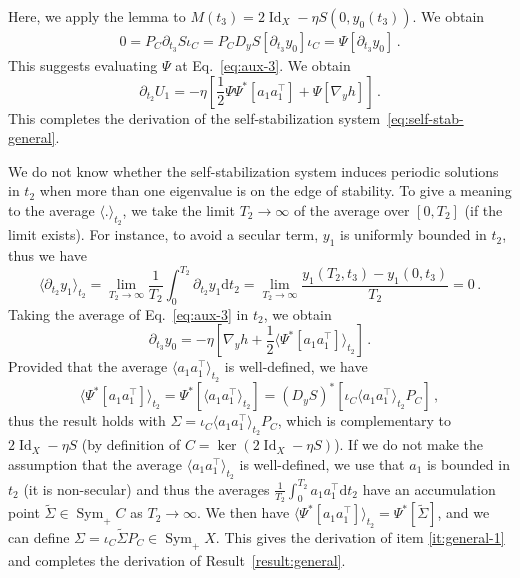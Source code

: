\documentclass[11pt,english,reqno]{article}
\DeclareMathOperator{\Id}{Id}
\DeclareMathOperator{\Sym}{Sym}
\newcommand{\diff}{\mathrm{d}}
\theoremstyle{plain}
\theoremstyle{definition}
\theoremstyle{remark}
\numberwithin{equation}{section}
\begin{document}
    Here, we apply the lemma to $M(t_3) = 2 \Id_X - \eta S(0,y_0(t_3))$. We obtain
    \begin{align*}
        0 = P_C \partial_{t_3} S \iota_C = P_C D_y S[\partial_{t_3} y_0] \iota_C = \Psi[\partial_{t_3} y_0] \, .
    \end{align*}
    This suggests evaluating $\Psi$ at Eq.~\eqref{eq:aux-3}. We obtain 
    \begin{equation*}
        \partial_{t_2} U_1 = - \eta \left[\frac{1}{2} \Psi\Psi^*[a_1 a_1^\top] + \Psi[\nabla_y h]\right] \, .
    \end{equation*}
    This completes the derivation of the self-stabilization system~\eqref{eq:self-stab-general}. 

    We do not know whether the self-stabilization system induces periodic solutions in $t_2$ when more than one eigenvalue is on the edge of stability. To give a meaning to the average $\langle . \rangle_{t_2}$, we take the limit $T_2 \to \infty$ of the average over $[0, T_2]$ (if the limit exists). For instance, to avoid a secular term, $y_1$ is uniformly bounded in $t_2$, thus we have 
    \begin{equation*}
        \langle \partial_{t_2} y_1 \rangle_{t_2} = \lim_{T_2 \to \infty} \frac{1}{T_2} \int_0^{T_2} \partial_{t_2} y_1  \diff t_2 = \lim_{T_2 \to \infty} \frac{y_1(T_2, t_3) - y_1(0, t_3)}{T_2} = 0 \, .
    \end{equation*}
    Taking the average of Eq.~\eqref{eq:aux-3} in $t_2$, we obtain
    \begin{equation*}
        \partial_{t_3} y_0 = - \eta \left[\nabla_y h + \frac{1}{2} \langle \Psi^*[a_1 a_1^\top] \rangle_{t_2}\right] \, .
    \end{equation*}
    Provided that the average $\langle a_1 a_1^\top \rangle_{t_2}$ is well-defined, we have 
    \begin{equation*}
        \langle \Psi^*[a_1 a_1^\top] \rangle_{t_2} = \Psi^*[\langle a_1 a_1^\top \rangle_{t_2}] = (D_y S)^*[\iota_C \langle a_1 a_1^\top \rangle_{t_2} P_C] \, , 
    \end{equation*}
    thus the result holds with $\Sigma = \iota_C \langle a_1 a_1^\top \rangle_{t_2} P_C$, which is complementary to $2 \Id_X - \eta S$ (by definition of $C = \ker(2 \Id_X - \eta S)$). If we do not make the assumption that the average $\langle a_1 a_1^\top \rangle_{t_2}$ is well-defined, we use that $a_1$ is bounded in $t_2$ (it is non-secular) and thus the averages $\frac{1}{T_2} \int_0^{T_2} a_1 a_1^\top \diff t_2$ have an accumulation point $\widetilde{\Sigma} \in \Sym_+ C$ as $T_2 \to \infty$. We then have $\langle \Psi^*[a_1 a_1^\top] \rangle_{t_2} = \Psi^*[\widetilde{\Sigma}]$, and we can define $\Sigma = \iota_C \widetilde{\Sigma} P_C \in \Sym_+ X$. This gives the derivation of item \ref{it:general-1} and completes the derivation of Result~\ref{result:general}.
\end{document}
